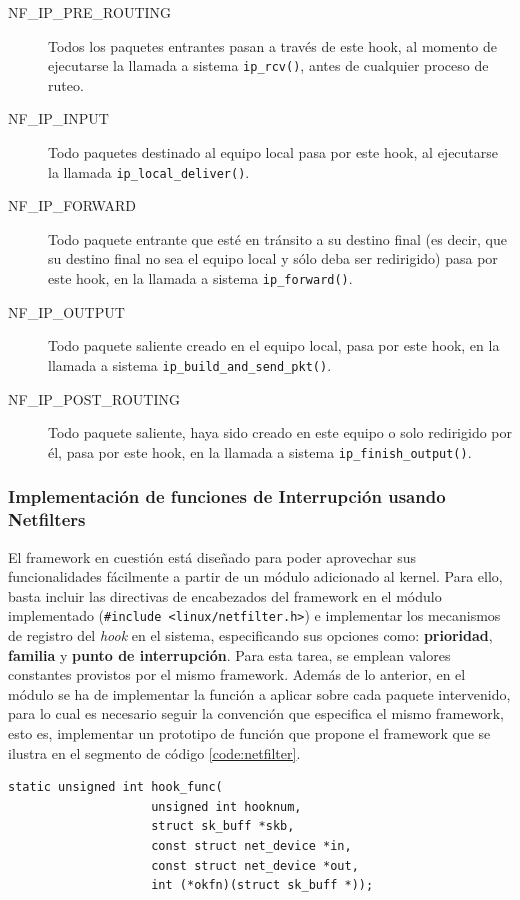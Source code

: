 \begin{description}
\item[NF\_IP\_PRE\_ROUTING] Todos los paquetes entrantes pasan a través de este hook, al momento de ejecutarse la llamada a sistema \verb=ip_rcv()=, antes de cualquier proceso de ruteo.
\item[NF\_IP\_INPUT] Todo paquetes destinado al equipo local pasa por este hook, al ejecutarse la llamada \verb=ip_local_deliver()=.
\item[NF\_IP\_FORWARD] Todo paquete entrante que esté en tránsito a su destino final (es decir, que su destino final no sea el equipo local y sólo deba ser redirigido) pasa por este hook, en la llamada a sistema \verb=ip_forward()=.
\item[NF\_IP\_OUTPUT] Todo paquete saliente creado en el equipo local, pasa por este hook, en la llamada a sistema \verb=ip_build_and_send_pkt()=.
\item[NF\_IP\_POST\_ROUTING] Todo paquete saliente, haya sido creado en este equipo o solo redirigido por él, pasa por este hook, en la llamada a sistema \verb=ip_finish_output()=.
\end{description}

\subsubsection{Implementación de funciones de Interrupción usando Netfilters}
El framework en cuestión está diseñado para poder aprovechar sus funcionalidades fácilmente a partir de un módulo adicionado al kernel. Para ello, basta incluir las directivas de encabezados del framework en el módulo implementado (\verb=#include <linux/netfilter.h>=) e implementar los mecanismos de registro del \emph{hook} en el sistema, especificando sus opciones como: \textbf{prioridad}, \textbf{familia} y \textbf{punto de interrupción}. Para esta tarea, se emplean valores constantes provistos por el mismo framework. Además de lo anterior, en el módulo se ha de implementar la función a aplicar sobre cada paquete intervenido, para lo cual es necesario seguir la convención que especifica el mismo framework, esto es, implementar un prototipo de función que propone el framework que se ilustra en el segmento de código \ref{code:netfilter}.

\vspace{1pc}
\begin{lstlisting}[style=CInputStyle, label=code:netfilter, captionpos=b, caption={Prototipo de la función de interrupción a ser definida en un \emph{hook} de Netfilters.}]
static unsigned int hook_func(
            		unsigned int hooknum,
            		struct sk_buff *skb, 
            		const struct net_device *in, 
            		const struct net_device *out, 
            		int (*okfn)(struct sk_buff *));
\end{lstlisting}


